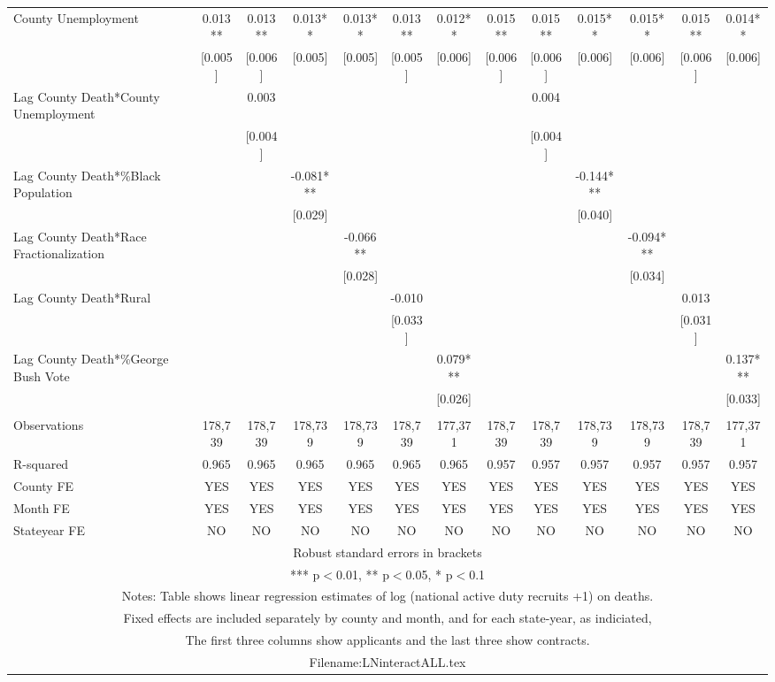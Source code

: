 \documentclass[]{article}
\begin{document}
\begin{tabular}{lcccccccccccc}
County Unemployment & 0.013** & 0.013** & 0.013** & 0.013** & 0.013** & 0.012** & 0.015** & 0.015** & 0.015** & 0.015** & 0.015** & 0.014** \\
 & [0.005] & [0.006] & [0.005] & [0.005] & [0.005] & [0.006] & [0.006] & [0.006] & [0.006] & [0.006] & [0.006] & [0.006] \\
Lag County Death*County Unemployment &  & 0.003 &  &  &  &  &  & 0.004 &  &  &  &  \\
 &  & [0.004] &  &  &  &  &  & [0.004] &  &  &  &  \\
Lag County Death*\%Black Population &  &  & -0.081*** &  &  &  &  &  & -0.144*** &  &  &  \\
 &  &  & [0.029] &  &  &  &  &  & [0.040] &  &  &  \\
Lag County Death*Race Fractionalization &  &  &  & -0.066** &  &  &  &  &  & -0.094*** &  &  \\
 &  &  &  & [0.028] &  &  &  &  &  & [0.034] &  &  \\
Lag County Death*Rural &  &  &  &  & -0.010 &  &  &  &  &  & 0.013 &  \\
 &  &  &  &  & [0.033] &  &  &  &  &  & [0.031] &  \\
Lag County Death*\%George Bush Vote &  &  &  &  &  & 0.079*** &  &  &  &  &  & 0.137*** \\
 &  &  &  &  &  & [0.026] &  &  &  &  &  & [0.033] \\
 &  &  &  &  &  &  &  &  &  &  &  &  \\
Observations & 178,739 & 178,739 & 178,739 & 178,739 & 178,739 & 177,371 & 178,739 & 178,739 & 178,739 & 178,739 & 178,739 & 177,371 \\
R-squared & 0.965 & 0.965 & 0.965 & 0.965 & 0.965 & 0.965 & 0.957 & 0.957 & 0.957 & 0.957 & 0.957 & 0.957 \\
County FE & YES & YES & YES & YES & YES & YES & YES & YES & YES & YES & YES & YES \\
Month FE & YES & YES & YES & YES & YES & YES & YES & YES & YES & YES & YES & YES \\
 Stateyear FE & NO & NO & NO & NO & NO & NO & NO & NO & NO & NO & NO & NO \\ \hline
\multicolumn{13}{c}{ Robust standard errors in brackets} \\
\multicolumn{13}{c}{ *** p$<$0.01, ** p$<$0.05, * p$<$0.1} \\
\multicolumn{13}{c}{ Notes: Table shows linear regression estimates of log (national active duty recruits +1) on deaths.} \\
\multicolumn{13}{c}{ Fixed effects are included separately by county and month, and for each state-year, as indiciated,} \\
\multicolumn{13}{c}{ The first three columns show applicants and the last three show contracts.} \\
\multicolumn{13}{c}{ Filename:LNinteractALL.tex} \\
\end{tabular}
\end{document}
